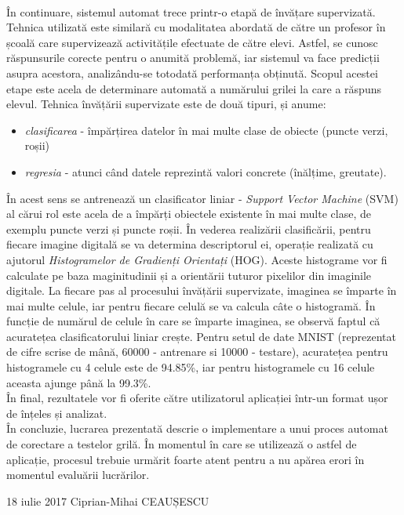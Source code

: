 \documentclass[a4paper,12pt]{report}
\newcommand\tab[1][1cm]{\hspace*{#1}}
\begin{document}
\\ \tab În continuare, sistemul automat trece printr-o etapă de învățare supervizată. Tehnica utilizată este similară cu modalitatea abordată de către un profesor în școală care supervizează activitățile efectuate de către elevi. Astfel, se cunosc răspunsurile corecte pentru o anumită problemă, iar sistemul va face predicții asupra acestora, analizându-se totodată performanța obținută. Scopul acestei etape este acela de determinare automată a numărului grilei la care a răspuns elevul. Tehnica învățării supervizate este de două tipuri, și anume:
\begin{itemize}
\item \textit{clasificarea} - împărțirea datelor în mai multe clase de obiecte (puncte verzi, roșii) 
\item \textit{regresia} - atunci când datele reprezintă valori concrete (înălțime, greutate). 
\end{itemize}
\tab În acest sens se antrenează un clasificator liniar - \textit{Support Vector Machine} (SVM) al cărui rol este acela de a împărți obiectele existente în mai multe clase, de exemplu puncte verzi și puncte roșii. În vederea realizării clasificării, pentru fiecare imagine digitală se va determina descriptorul ei, operație realizată cu ajutorul \textit{Histogramelor de Gradienți Orientați} (HOG). Aceste histograme vor fi calculate pe baza maginitudinii și a orientării tuturor pixelilor din imaginile digitale. La fiecare pas al procesului învățării supervizate, imaginea se împarte în mai multe celule, iar pentru fiecare celulă se va calcula câte o histogramă. În funcție de numărul de celule în care se împarte imaginea, se observă faptul că acuratețea clasificatorului liniar crește. Pentru setul de date MNIST (reprezentat de cifre scrise de mână, 60000 - antrenare si 10000 - testare), acuratețea pentru histogramele cu 4 celule este de 94.85\%, iar pentru histogramele cu 16 celule aceasta ajunge până la 99.3\%.
\\ \tab În final, rezultatele vor fi oferite către utilizatorul aplicației într-un format ușor de înțeles și analizat.
\\ \tab În concluzie, lucrarea prezentată descrie o implementare a unui proces automat de corectare a testelor grilă. În momentul în care se utilizează o astfel de aplicație, procesul trebuie urmărit foarte atent pentru a nu apărea erori în momentul evaluării lucrărilor. 

\vspace {3cm}

18 iulie 2017 \hspace{8cm} Ciprian-Mihai CEAUȘESCU
\end{document}
